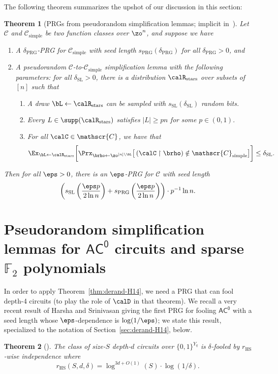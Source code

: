 \documentclass[11pt]{article}
\numberwithin{equation}{section}
\newtheorem{theorem}{Theorem}[section]
\theoremstyle{definition}
\theoremstyle{plain}
\theoremstyle{plain}
\newcommand{\acz}{\mathsf{AC^0}}
\newcommand{\uhr}{\upharpoonright}
\newcommand{\simple}{\mathrm{simple}}
\newcommand{\stars}{\mathrm{stars}}
\newcommand{\PRG}{\mathrm{PRG}}
\newcommand{\SL}{\mathrm{SL}}
\renewcommand{\F}{\mathds{F}}
\begin{document}
The following theorem summarizes the upshot of our discussion in this section: 

\begin{theorem}[PRGs from pseudorandom simplification lemmas; implicit in~\cite{AjtaiWigderson:85}]
\label{thm:AW}
Let $\mathscr{C}$ and $\mathscr{C}_\simple$ be two function classes over $\zo^n$, and suppose we have 
\begin{enumerate}
\item A $\delta_\PRG$-PRG for $\mathscr{C}_\simple$ with seed length $s_\PRG(\delta_\PRG)$ for all $\delta_\PRG > 0$, and 
\item A pseudorandom $\mathscr{C}$-to-$\mathscr{C}_\simple$ simplification lemma with the following parameters: for all $\delta_\SL > 0$, there is a distribution $\calR_\stars$ over subsets of $[n]$ such that 
\begin{enumerate}
\item A draw $\bL \leftarrow\calR_\stars$ can be sampled with $s_\SL(\delta_\SL)$ random bits. 
\item Every $L \in \supp(\calR_\stars)$ satisfies $|L| \ge pn$ for some $p \in (0,1)$. 
\item For all $\calC \in \mathscr{C}$, we have that 
 \[ \Ex_{\bL\leftarrow\calR_{\stars}}\bigg[ \Prx_{\brho\leftarrow\zo^{[n]\setminus \bL}}\big[\, (\calC \uhr \brho) \notin \mathscr{C}_\simple\big] \bigg]  \le \delta_\SL.\] 
 \end{enumerate} 
\end{enumerate} 
Then for all $\eps > 0$, there is an $\eps$-PRG for $\mathscr{C}$ with seed length
\[ \left(s_\SL\left(\frac{\eps p}{2\ln n}\right) + s_\PRG\left(\frac{\eps p}{2\ln n}\right)\right) \cdot p^{-1}\ln n.\] 
\end{theorem} 






\section{Pseudorandom simplification lemmas for $\acz$ circuits and sparse $\F_2$ polynomials}  \label{sec:prsl}

In order to apply Theorem~\ref{thm:derand-H14}, we need a PRG that can fool depth-4 circuits (to play the role of $\calD$ in that theorem).
We recall a very recent result of Harsha and Srinivasan giving the first PRG for fooling $\acz$ with a seed length whose $\eps$-dependence is $\log(1/\eps)$; we state this result, specialized to the notation of Section~\ref{sec:derand-H14}, below.
\begin{theorem}[\cite{HS16journal}]
\label{thm:HS16journal}
The class of size-$S$ depth-$d$ circuits over $\{0,1\}^{Y_q}$ is $\delta$-fooled by $r_{\mathrm{HS}}$-wise independence where 
\[ r_{\mathrm{HS}}(S,d,\delta) = \log^{3d+O(1)}(S) \cdot \log(1/\delta). \]
\end{theorem}
\end{document}
